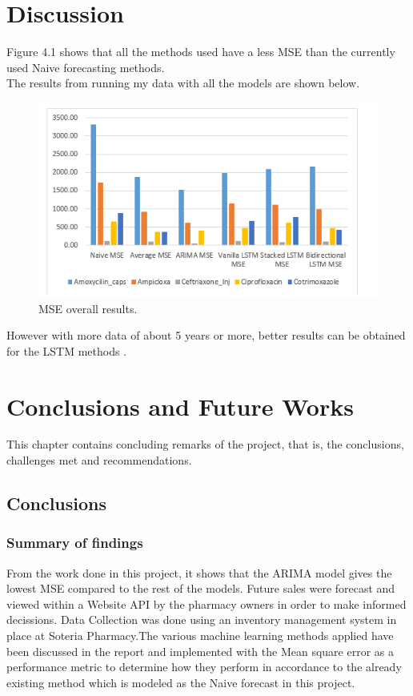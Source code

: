 \documentclass[12pt]{report}
\begin{document}
\chapter{Discussion}

Figure 4.1 shows that all the methods used have a less MSE than the currently used Naive forecasting methods.\\
The results from running my data with all the models are shown below.


\begin{figure}[H]%
\begin {center}
\includegraphics[width=1\textwidth]{images/chart.png}
\caption{MSE overall results.}
\label{fig:ecg}
\end {center}
\end{figure}

However with more data of about 5 years or more, better results can be obtained for the LSTM methods .


\chapter{Conclusions and Future Works}
This chapter contains concluding remarks of the project, that is, the conclusions, challenges met and recommendations.


\section{Conclusions}

\subsection{Summary of findings}
From the work done in this project, it shows that the ARIMA model gives the lowest MSE compared to the rest of the models.
Future sales were  forecast and viewed within a Website API by the pharmacy owners in order to make informed decissions.
Data Collection was done using an inventory management system in place at Soteria Pharmacy.The various machine learning methods applied have been discussed in the report and implemented with the Mean square error as a performance metric to determine how they perform in accordance to the already existing method which is modeled as the Naive forecast in this project.
\end{document}
